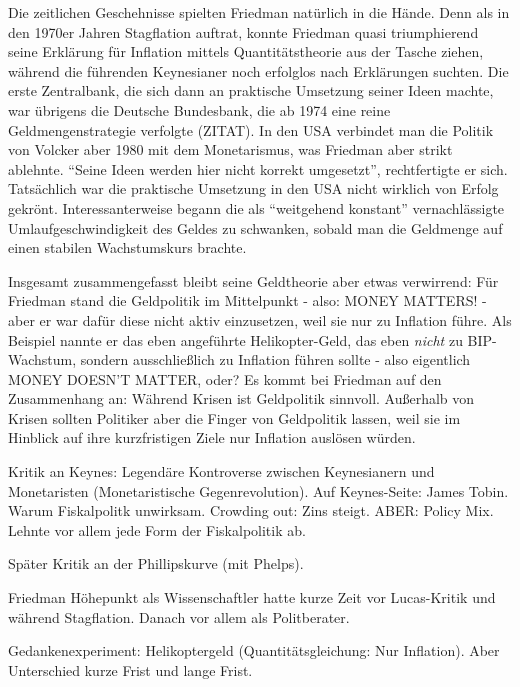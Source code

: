 Die zeitlichen Geschehnisse spielten Friedman natürlich in die Hände. Denn als in den 1970er Jahren Stagflation auftrat, konnte Friedman quasi triumphierend seine Erklärung für Inflation mittels Quantitätstheorie aus der Tasche ziehen, während die führenden Keynesianer noch erfolglos nach Erklärungen suchten. Die erste Zentralbank, die sich dann an praktische Umsetzung seiner Ideen machte, war übrigens die Deutsche Bundesbank, die ab 1974 eine reine Geldmengenstrategie verfolgte (ZITAT). In den USA verbindet man die Politik von Volcker aber 1980 mit dem Monetarismus, was Friedman aber strikt ablehnte. "`Seine Ideen werden hier nicht korrekt umgesetzt"', rechtfertigte er sich. Tatsächlich war die praktische Umsetzung in den USA nicht wirklich von Erfolg gekrönt. Interessanterweise begann die als "`weitgehend konstant"' vernachlässigte Umlaufgeschwindigkeit des Geldes zu schwanken, sobald man die Geldmenge auf einen stabilen Wachstumskurs brachte.



Insgesamt zusammengefasst bleibt seine Geldtheorie aber etwas verwirrend: Für Friedman stand die Geldpolitik im Mittelpunkt - also: MONEY MATTERS! - aber er war dafür diese nicht aktiv einzusetzen, weil sie nur zu Inflation führe. Als Beispiel nannte er das eben angeführte Helikopter-Geld, das eben \textit{nicht} zu BIP-Wachstum, sondern ausschließlich zu Inflation führen sollte - also eigentlich MONEY DOESN'T MATTER, oder? Es kommt bei Friedman auf den Zusammenhang an: Während Krisen ist Geldpolitik sinnvoll. Außerhalb von Krisen sollten Politiker aber die Finger von Geldpolitik lassen, weil sie im Hinblick auf ihre kurzfristigen Ziele nur Inflation auslösen würden.



Kritik an Keynes: Legendäre Kontroverse zwischen Keynesianern und Monetaristen (Monetaristische Gegenrevolution). Auf Keynes-Seite: James Tobin. Warum Fiskalpolitk unwirksam. Crowding out: Zins steigt. ABER: Policy Mix. Lehnte vor allem jede Form der Fiskalpolitik ab.



Später Kritik an der Phillipskurve (mit Phelps).


Friedman  Höhepunkt als Wissenschaftler hatte kurze Zeit vor Lucas-Kritik und während Stagflation. Danach vor allem als Politberater.



Gedankenexperiment: Helikoptergeld (Quantitätsgleichung: Nur Inflation). Aber Unterschied kurze Frist und lange Frist.

